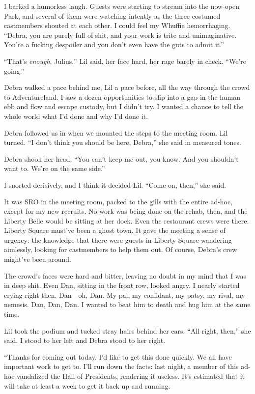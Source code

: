 I barked a humorless laugh. Guests were starting to stream into the
now-open Park, and several of them were watching intently as the
three costumed castmembers shouted at each other. I could feel my
Whuffie hemorrhaging. “Debra, you are purely full of shit, and your
work is trite and unimaginative. You're a fucking despoiler and you
don't even have the guts to admit it.”

“That's \emph{enough}, Julius,” Lil said, her face hard, her rage
barely in check. “We're going.”

Debra walked a pace behind me, Lil a pace before, all the way
through the crowd to Adventureland. I saw a dozen opportunities to
slip into a gap in the human ebb and flow and escape custody, but I
didn't try. I wanted a chance to tell the whole world what I'd done
and why I'd done it.

Debra followed us in when we mounted the steps to the meeting room.
Lil turned. “I don't think you should be here, Debra,” she said in
measured tones.

Debra shook her head. “You can't keep me out, you know. And you
shouldn't want to. We're on the same side.”

I snorted derisively, and I think it decided Lil. “Come on, then,”
she said.

It was SRO in the meeting room, packed to the gills with the entire
ad-hoc, except for my new recruits. No work was being done on the
rehab, then, and the Liberty Belle would be sitting at her dock.
Even the restaurant crews were there. Liberty Square must've been a
ghost town. It gave the meeting a sense of urgency: the knowledge
that there were guests in Liberty Square wandering aimlessly,
looking for castmembers to help them out. Of course, Debra's crew
might've been around.

The crowd's faces were hard and bitter, leaving no doubt in my mind
that I was in deep shit. Even Dan, sitting in the front row, looked
angry. I nearly started crying right then. Dan—oh, Dan. My pal, my
confidant, my patsy, my rival, my nemesis. Dan, Dan, Dan. I wanted
to beat him to death and hug him at the same time.

Lil took the podium and tucked stray hairs behind her ears. “All
right, then,” she said. I stood to her left and Debra stood to her
right.

“Thanks for coming out today. I'd like to get this done quickly. We
all have important work to get to. I'll run down the facts: last
night, a member of this ad-hoc vandalized the Hall of Presidents,
rendering it useless. It's estimated that it will take at least a
week to get it back up and running.

